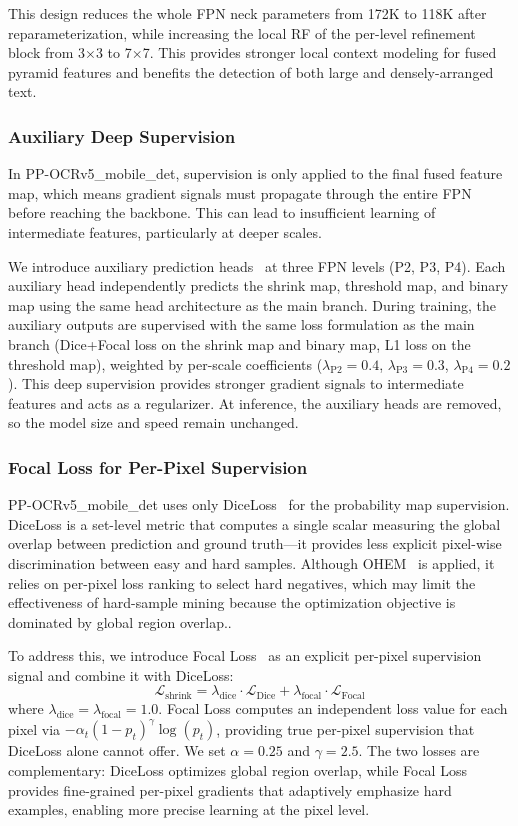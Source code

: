 \documentclass[11pt, a4paper,logo,  copyright, nonumbering]{paddleocr}
\begin{document}
This design reduces the whole FPN neck parameters from 172K to 118K after reparameterization, while increasing the local RF of the per-level refinement block from 3$\times$3 to 7$\times$7. This provides stronger local context modeling for fused pyramid features and benefits the detection of both large and densely-arranged text.
\subsubsection{Auxiliary Deep Supervision}
In PP-OCRv5\_mobile\_det, supervision is only applied to the final fused feature map, which means gradient signals must propagate through the entire FPN before reaching the backbone. This can lead to insufficient learning of intermediate features, particularly at deeper scales.

We introduce auxiliary prediction heads~\cite{lee2015deeply} at three FPN levels (P2, P3, P4). Each auxiliary head independently predicts the shrink map, threshold map, and binary map using the same head architecture as the main branch. During training, the auxiliary outputs are supervised with the same loss formulation as the main branch (Dice+Focal loss on the shrink map and binary map, L1 loss on the threshold map), weighted by per-scale coefficients ($\lambda_{\text{P2}}=0.4$, $\lambda_{\text{P3}}=0.3$, $\lambda_{\text{P4}}=0.2$). This deep supervision provides stronger gradient signals to intermediate features and acts as a regularizer. At inference, the auxiliary heads are removed, so the model size and speed remain unchanged.

\subsubsection{Focal Loss for Per-Pixel Supervision}
PP-OCRv5\_mobile\_det uses only DiceLoss~\cite{milletari2016v} for the probability map supervision. DiceLoss is a set-level metric that computes a single scalar measuring the global overlap between prediction and ground truth---it provides less explicit pixel-wise discrimination between easy and hard samples. Although OHEM~\cite{shrivastava2016training} is applied, it relies on per-pixel loss ranking to select hard negatives, which may limit the effectiveness of hard-sample mining because the optimization objective is dominated by global region overlap..

To address this, we introduce Focal Loss~\cite{lin2017focal} as an explicit per-pixel supervision signal and combine it with DiceLoss:
\begin{equation}
\mathcal{L}_{\text{shrink}} = \lambda_{\text{dice}} \cdot \mathcal{L}_{\text{Dice}} + \lambda_{\text{focal}} \cdot \mathcal{L}_{\text{Focal}}
\end{equation}
where $\lambda_{\text{dice}} = \lambda_{\text{focal}} = 1.0$. Focal Loss computes an independent loss value for each pixel via $-\alpha_t(1-p_t)^\gamma \log(p_t)$, providing true per-pixel supervision that DiceLoss alone cannot offer. We set $\alpha=0.25$ and $\gamma=2.5$. The two losses are complementary: DiceLoss optimizes global region overlap, while Focal Loss provides fine-grained per-pixel gradients that adaptively emphasize hard examples, enabling more precise learning at the pixel level.
\end{document}

